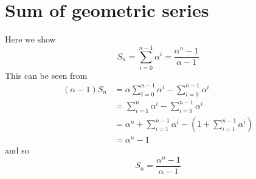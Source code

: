 \documentclass{report}
\begin{document}
\section{Sum of geometric series}
Here we show
\begin{equation*}
S_n=\sum^{n-1}_{i=0}\alpha^i=\frac{\alpha^n-1}{\alpha-1}
\end{equation*}
This can be seen from
\begin{align*}
(\alpha-1)S_n&=\alpha\sum^{n-1}_{i=0}\alpha^i-\sum^{n-1}_{i=0}\alpha^i\\
&=\sum^{n}_{i=1}\alpha^i-\sum^{n-1}_{i=0}\alpha^i\\
&=\alpha^n+\sum^{n-1}_{i=1}\alpha^i-(1+\sum^{n-1}_{i=1}\alpha^i)\\
&=\alpha^n-1
\end{align*}
and so
\begin{equation*}
S_n=\frac{\alpha^n-1}{\alpha-1}
\end{equation*}
\end{document}
